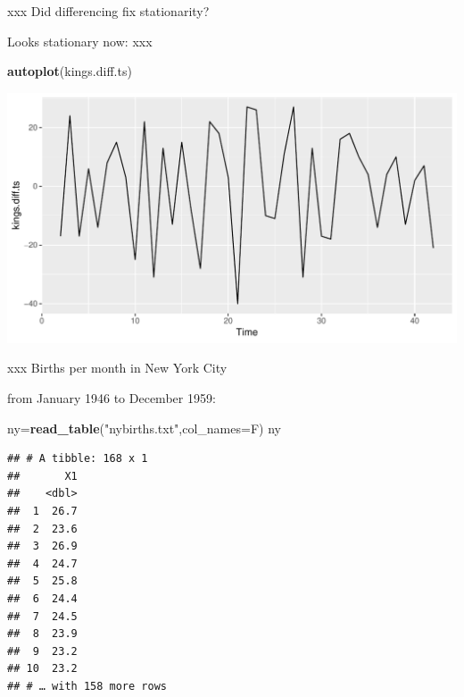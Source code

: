 \documentclass[ignorenonframetext,]{beamer}
\newenvironment{Shaded}{\begin{snugshade}}{\end{snugshade}}
\newcommand{\DataTypeTok}[1]{\textcolor[rgb]{0.13,0.29,0.53}{#1}}
\newcommand{\KeywordTok}[1]{\textcolor[rgb]{0.13,0.29,0.53}{\textbf{#1}}}
\newcommand{\NormalTok}[1]{#1}
\newcommand{\StringTok}[1]{\textcolor[rgb]{0.31,0.60,0.02}{#1}}
\begin{document}
\begin{frame}[fragile]{xxx Did differencing fix stationarity?}
\protect\hypertarget{xxx-did-differencing-fix-stationarity}{}

Looks stationary now: xxx

\begin{Shaded}
\begin{Highlighting}[]
\KeywordTok{autoplot}\NormalTok{(kings.diff.ts)}
\end{Highlighting}
\end{Shaded}

\includegraphics{figure/Differenced-Kings-Series-1.pdf}

\end{frame}

\begin{frame}[fragile]{xxx Births per month in New York City}
\protect\hypertarget{xxx-births-per-month-in-new-york-city}{}

from January 1946 to December 1959:

\small

\begin{Shaded}
\begin{Highlighting}[]
\NormalTok{ny=}\KeywordTok{read_table}\NormalTok{(}\StringTok{"nybirths.txt"}\NormalTok{,}\DataTypeTok{col_names=}\NormalTok{F)}
\NormalTok{ny}
\end{Highlighting}
\end{Shaded}

\begin{verbatim}
## # A tibble: 168 x 1
##       X1
##    <dbl>
##  1  26.7
##  2  23.6
##  3  26.9
##  4  24.7
##  5  25.8
##  6  24.4
##  7  24.5
##  8  23.9
##  9  23.2
## 10  23.2
## # … with 158 more rows
\end{verbatim}

\normalsize

\end{frame}
\end{document}
